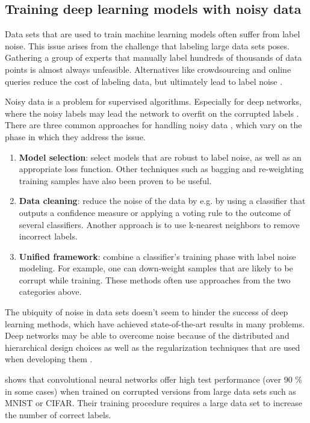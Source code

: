 \subsection{Training deep learning models with noisy data} \label{noisy_data}

Data sets that are used to train machine learning models often suffer from label noise. This issue arises from the challenge that labeling large data sets poses. Gathering a group of experts that manually label hundreds of thousands of data points is almost always unfeasible. Alternatives like crowdsourcing and online queries reduce the cost of labeling data, but ultimately lead to label noise \cite{chen2019understanding}.

Noisy data is a problem for supervised algorithms. Especially for deep networks, where the noisy labels may lead the network to overfit on the corrupted labels \cite{chen2019understanding}. There are three common approaches for handling noisy data \cite{karimi2020deep}, which vary on the phase in which they address the issue.

\begin{enumerate}
    \item \textbf{Model selection}: select models that are robust to label noise, as well as an appropriate loss function. Other techniques such as bagging and re-weighting training samples have also been proven to be useful.
    \item \textbf{Data cleaning}: reduce the noise of the data by e.g. by using a classifier that outputs a confidence measure or applying a voting rule to the outcome of several classifiers. Another approach is to use k-nearest neighbors to remove incorrect labels.
    \item \textbf{Unified framework}: combine a classifier's training phase with label noise modeling. For example, one can down-weight samples that are likely to be corrupt while training. These methods often use approaches from the two categories above.
\end{enumerate}

The ubiquity of noise in data sets doesn't seem to hinder the success of deep learning methods, which have achieved state-of-the-art results in many problems. Deep networks may be able to overcome noise because of the distributed and hierarchical design choices as well as the regularization techniques that are used when developing them \cite{arpit2017closer}.

\cite{rolnick2017deep} shows that convolutional neural networks offer high test performance (over 90 \% in some cases) when trained on corrupted versions from large data sets such as MNIST or CIFAR. Their training procedure requires a large data set to increase the number of correct labels.